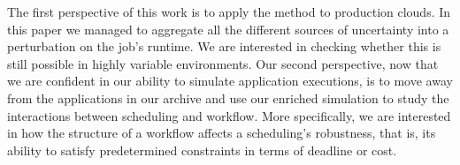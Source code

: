 \documentclass[10pt,conference,compsocconf]{IEEEtran}
\begin{document}
The  first  perspective of  this  work  is to  apply  the  method to  production
clouds.  In this  paper we  managed to  aggregate all  the different  sources of
uncertainty  into a  perturbation on  the job's  runtime. We  are interested  in
checking whether  this is  still possible in  highly variable  environments. Our
second  perspective, now  that  we  are confident  in  our  ability to  simulate
application executions, is to move away from the applications in our archive and
use our  enriched simulation  to study the  interactions between  scheduling and
workflow.  More specifically,  we  are  interested in  how  the  structure of  a
workflow  affects a  scheduling's robustness,  that is,  its ability  to satisfy
predetermined constraints in terms of deadline or cost.










\newpage
\end{document}
